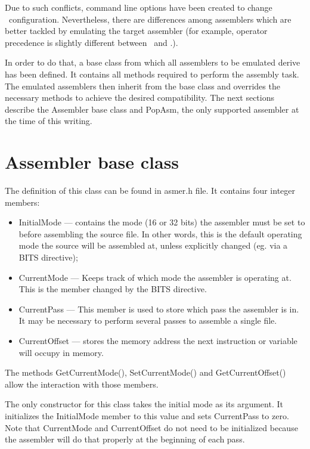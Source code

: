 \documentclass[a4paper,draft,12pt]{book}
\begin{document}
Due to such conflicts, command line options have been created to change
\popasm\ configuration. Nevertheless, there are differences among
assemblers which are better tackled by emulating the target assembler
(for example, operator precedence is slightly different between \popasm\ 
and \nasm.).

In order to do that, a base class from which all assemblers to be emulated
derive has been defined. It contains all methods required to perform
the assembly task. The emulated assemblers then inherit from the base
class and overrides the necessary methods to achieve the desired compatibility.
The next sections describe the Assembler base class and PopAsm, the
only supported assembler at the time of this writing.

\section{Assembler base class}
The definition of this class can be found in asmer.h file. It contains four
integer members:

\begin{itemize}
\item InitialMode --- contains the mode (16 or 32 bits) the assembler must
be set to before assembling the source file. In other words, this is the
default operating mode the source will be assembled at, unless explicitly
changed (eg. via a BITS directive);

\item CurrentMode --- Keeps track of which mode the assembler is operating
at. This is the member changed by the BITS directive.

\item CurrentPass --- This member is used to store which pass the assembler
is in. It may be necessary to perform several passes to assemble a single file.

\item CurrentOffset --- stores the memory address the next instruction or
variable will occupy in memory.
\end{itemize}

The methods GetCurrentMode(), SetCurrentMode() and GetCurrentOffset() allow
the interaction with those members.

The only constructor for this class takes the initial mode as its argument.
It initializes the InitialMode member to this value and sets CurrentPass
to zero. Note that CurrentMode and CurrentOffset do not need to be
initialized because the assembler will do that properly at the beginning of
each pass.
\end{document}

